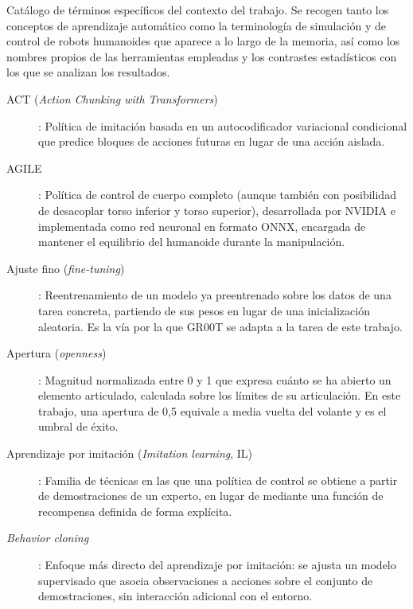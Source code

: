 \label{chap:glosario}
\pagestyle{headings}



Catálogo de términos específicos del contexto del trabajo. Se recogen tanto los conceptos de
aprendizaje automático como la terminología de simulación y de control de robots humanoides que
aparece a lo largo de la memoria, así como los nombres propios de las herramientas empleadas y los
contrastes estadísticos con los que se analizan los resultados.


\begin{description}

	\item[ACT (\textit{Action Chunking with Transformers})]: Política de imitación basada en un
	autocodificador variacional condicional que predice bloques de acciones futuras en lugar de
	una acción aislada.

	\item[AGILE]: Política de control de cuerpo completo (aunque también con posibilidad de
	desacoplar torso inferior y torso superior), desarrollada por NVIDIA e implementada como red
	neuronal en formato ONNX, encargada de mantener el equilibrio del humanoide durante la
	manipulación.

	\item[Ajuste fino (\textit{fine-tuning})]: Reentrenamiento de un modelo ya preentrenado sobre
	los datos de una tarea concreta, partiendo de sus pesos en lugar de una inicialización
	aleatoria. Es la vía por la que GR00T se adapta a la tarea de este trabajo.

	\item[Apertura (\textit{openness})]: Magnitud normalizada entre 0 y 1 que expresa cuánto se ha
	abierto un elemento articulado, calculada sobre los límites de su articulación. En este
	trabajo, una apertura de 0,5 equivale a media vuelta del volante y es el umbral de éxito.

	\item[Aprendizaje por imitación (\textit{Imitation learning}, IL)]: Familia de técnicas en las
	que una política de control se obtiene a partir de demostraciones de un experto, en lugar de
	mediante una función de recompensa definida de forma explícita.

	\item[\textit{Behavior cloning}]: Enfoque más directo del aprendizaje por imitación: se ajusta
	un modelo supervisado que asocia observaciones a acciones sobre el conjunto de
	demostraciones, sin interacción adicional con el entorno.


\end{description}
